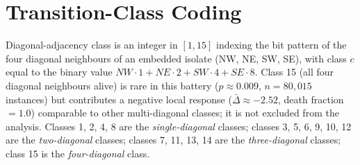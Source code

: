 \documentclass[aip,cha,preprint,nofootinbib]{revtex4-2}
\begin{document}
\section{Transition-Class Coding}
\label{app:classes}

Diagonal-adjacency class is an integer in $[1, 15]$ indexing the bit
pattern of the four diagonal neighbours of an embedded isolate
(NW, NE, SW, SE), with class $c$ equal to the binary value
$\textit{NW}\cdot 1 + \textit{NE}\cdot 2 + \textit{SW}\cdot 4 +
\textit{SE}\cdot 8$.
Class 15 (all four diagonal neighbours alive) is rare in this battery
($p \approx 0.009$, $n = 80{,}015$ instances) but contributes a negative
local response ($\bar\Delta \approx -2.52$, death fraction $= 1.0$)
comparable to other multi-diagonal classes; it is not excluded from
the analysis.
Classes 1, 2, 4, 8 are the \emph{single-diagonal} classes;
classes 3, 5, 6, 9, 10, 12 are the \emph{two-diagonal} classes;
classes 7, 11, 13, 14 are the \emph{three-diagonal} classes;
class 15 is the \emph{four-diagonal} class.




\end{document}
